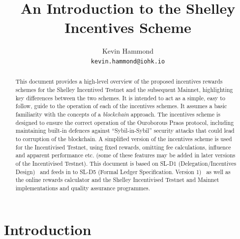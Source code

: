 \documentclass[11pt,a4paper,dvipsnames,twosided,final]{article}
\begin{document}
\renewcommand{\thepage}{\arabic{page}}
\setcounter{page}{1}

\title{An Introduction to the Shelley Incentives Scheme}

\author{Kevin Hammond  \\ {\small \texttt{kevin.hammond@iohk.io}}}

\maketitle

\begin{abstract}
  \noindent
  This document provides a high-level overview of the proposed incentives rewards schemes for
  the Shelley Incentived Testnet and the subsequent Mainnet, highlighting key
  differences between the two schemes.  It is intended to act as a
  simple, easy to follow, guide to the operation of each of the incentives schemes.
  It assumes a basic familiarity with the concepts of a \emph{blockchain} approach.
  The incentives scheme is designed to ensure the correct operation of the Ouroborous Praos
  protocol, including maintaining built-in defences against ``Sybil-in-Sybil'' security attacks
  that could lead to corruption of the blockchain.
  A simplified version of the incentives scheme is used for the Incentivised Testnet, using fixed rewards,
  omitting fee calculations, influence and apparent performance etc. (some of these features may be
  added in later versions of the Incentivised Testnet).
  This document is based on SL-D1 (Delegation/Incentives Design)~\cite{delegation_design} and feeds in to SL-D5
  (Formal Ledger Specification. Version 1)~\cite{shelley_spec} as well as the online rewards calculator and the Shelley Incentivised Testnet and Mainnet  implementations and quality assurance programmes.
\end{abstract}

\clearpage
\section{Introduction}
\label{sec:introduction}
\end{document}
